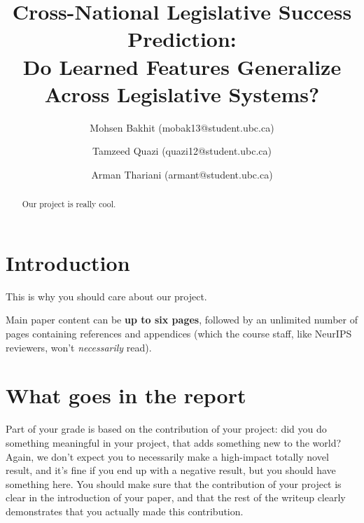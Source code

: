 \documentclass{article}
\title{Cross-National Legislative Success Prediction:\\
Do Learned Features Generalize Across Legislative Systems?}
\author{
  Mohsen Bakhit (mobak13@student.ubc.ca) \\
  \and
  Tamzeed Quazi (quazi12@student.ubc.ca) \\
  \and
  Arman Thariani (armant@student.ubc.ca) \\
}
\begin{document}
\maketitle


\begin{abstract}
    Our project is really cool.
\end{abstract}


\section{Introduction}

This is why you should care about our project.

Main paper content can be \textbf{up to six pages},
followed by an unlimited number of pages containing references and appendices
(which the course staff, like NeurIPS reviewers, won't \emph{necessarily} read).

\section{What goes in the report}
Part of your grade is based on the contribution of your project:
did you do something meaningful in your project, that adds something new to the world?
Again, we don't expect you to necessarily make a high-impact totally novel result,
and it's fine if you end up with a negative result,
but you should have something here.
You should make sure that the contribution of your project is clear in the introduction of your paper,
and that the rest of the writeup clearly demonstrates that you actually made this contribution.
\end{document}
